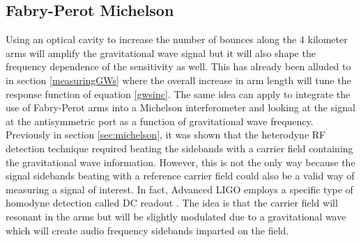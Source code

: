 		\subsection{Fabry-Perot Michelson}\label{FPmich}
		Using an optical cavity to increase the number of bounces along the 4 kilometer arms will amplify the gravitational wave signal but it will also shape the frequency dependence of the sensitivity as well.  This has already been alluded to in section \ref{measuringGWs} where the overall increase in arm length will tune the response function of equation \ref{gwsinc}.  The same idea can apply to integrate the use of Fabry-Perot arms into a Michelson interferometer and looking at the signal at the antisymmetric port as a function of gravitational wave frequency. Previously in section \ref{sec:michelson}, it was shown that the heterodyne RF detection technique required beating the sidebands with a carrier field containing the gravitational wave information.  However, this is not the only way because the signal sidebands beating with a reference carrier field could also be a valid way of measuring a signal of interest. In fact, Advanced LIGO employs a specific type of homodyne detection called DC readout \cite{FritschelReadout}\cite{FritschelAdvancedLIGO}. The idea is that the carrier field will resonant in the arms but will be slightly modulated due to a gravitational wave which will create audio frequency sidebands imparted on the field.  
		
